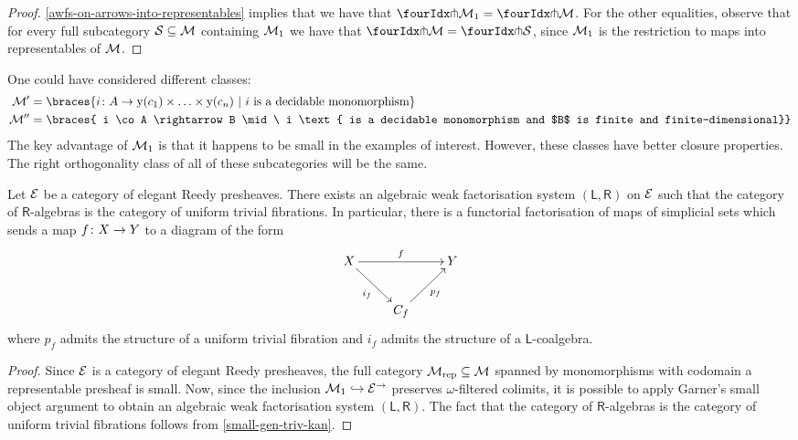 \documentclass[reqno,10pt,a4paper,oneside]{amsart}
\begin{document}
\begin{proof}    \cref{awfs-on-arrows-into-representables} implies that we have that $\liftr{\cal{M}_1}  = \liftr{\cal{M}}$.
For the other equalities, observe that for every full subcategory $\cal{S} \subseteq \cal{M}$ containing $\cal{M}_1$ we have that $\liftr{\cal{M}} = \liftr{\cal{S}}$, since $\cal{M}_1$ is the restriction to maps into representables  of $\cal{M}$. 
\end{proof}


\begin{remark} One could have considered different classes:
\begin{align*}
\cal{M}'  & = \braces{i \co A \rightarrow \yon(c_1) \times \ldots \times \yon(c_n)
\ | \ i \text{ is a  decidable monomorphism} }  \\
\cal{M}''  & = \braces{ i \co A \rightarrow B \mid \ i \text{ is a decidable monomorphism and 
$B$ is finite and finite-dimensional}} 
\end{align*}
The key advantage of $\cal{M}_1$ is that it happens to be small in the examples of interest. However, 
these classes have better closure properties. The right orthogonality class of all of these subcategories
will be the same.
\end{remark}





\begin{corollary} Let $\catE$ be a category of elegant Reedy presheaves. 
There exists an algebraic weak factorisation system $(\mathsf{L}, \mathsf{R})$ on
$\cal{E}$ such that the category of $\mathsf{R}$-algebras is the category of uniform trivial  fibrations. 
In particular, there is a functorial factorisation of maps of simplicial sets which sends
a map $f \co X \to Y$ to a diagram of the form
\[
\xymatrix{ 
X \ar[rr]^f \ar[dr]_{i_f}  & & Y \\
 & C_f \ar[ur]_{p_f} }
 \]
 where $p_f$ admits the structure of  a uniform trivial  fibration and 
 $i_f$ admits the structure of a $\mathsf{L}$-coalgebra.
\end{corollary}

\begin{proof} Since $\catE$ is a category of elegant Reedy presheaves, 
the full category $\cal{M}_{\textup{rep}} \subseteq \cal{M}$  spanned by 
 monomorphisms with codomain a representable
presheaf is small. Now, since 
the inclusion $\cal{M}_1 \hookrightarrow \catE^\to$ preserves $\omega$-filtered colimits, 
it is possible to apply Garner's small object argument to
obtain an algebraic weak factorisation system $(\mathsf{L}, \mathsf{R})$.
The fact that the category of $\mathsf{R}$-algebras is the category of uniform trivial fibrations
 follows from \cref{small-gen-triv-kan}.
 \end{proof} 
\end{document}
